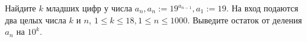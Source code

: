 Найдите $k$ младших цифр у числа $a_n, a_n := 19^{a_{n-1}}, a_1 := 19$.
\InputFile
На вход подаются два целых
числа $k$ и $n$, $1 \le k \le 18, 1 \le n \le 1000$.
\OutputFile
Выведите остаток от деления $a_n$ на $10^k$.

